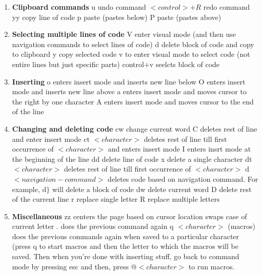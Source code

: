\documentclass[11pt]{article}
\theoremstyle{definition}
\begin{document}
\begin{enumerate}
    \item {\bf Clipboard commands} \n 
    {\code u} undo command \n 
    {\code $<control> + R$} redo command \n 
    {\code yy} copy line of code \n 
    {\code p} paste (pastes below) \n 
    {\code P} paste (pastes above)
    \item {\bf Selecting multiple lines of code} \n 
    {\code V} enter visual mode (and then use navigation commands to select lines of code) \n 
    {\code d} delete block of code and copy to clipboard \n
    {\code y} copy selected code \n 
    {\code v} to enter visual mode to select code (not entire lines but just specific parts) \n
    {\code control+v} seelcts block of code
    
    \item {\bf Inserting} \n 
    {\code o} enters insert mode and inserts new line below \n 
    {\code O} enters insert mode and inserts new line above \n 
    {\code a} enters insert mode and moves cursor to the right by one character \n 
    {\code A} enters insert mode and moves cursor to the end of the line \n 
    
    \item {\bf Changing and deleting code} \n 
    {\code cw} change current word \n 
    {\code C} deletes rest of line and enter insert mode \n
    {\code ct $<character>$} deletes rest of line till first occurrence of $<character>$ and enters insert mode \n 
    {\code I} enters insrt mode at the beginning of the line
    {\code dd} delete line of code \n 
    {\code x} delete a single character
    {\code dt $<character>$} deletes rest of line till first occurrence of $<character>$ \n 
    {\code d$<navigation-command>$} deletes code based on navigation command. For example, {\code d$\}$ } will delete a block of code \n 
    {\code dw} delete current word \n 
    {\code D} delete rest of the current line \n
    {\code r} replace single letter \n
    {\code R} replace multiple letters \n 
    
    
    \item {\bf Miscellaneous} \n 
    {\code zz} centers the page based on cursor location \n {\code $\sim$} swaps case of current letter \n 
    {\code .} does the previous command again \n 
    {\code q $<character>$} (macros) does the previous commands again when saved to a particular character (press q to start macros and then the letter to which the macros will be saved. Then when you're done with inserting stuff, go back to command mode by pressing esc and then, press @$<character>$ to run macros.
    {\code }
    
    
    
\end{enumerate}
\end{document}
